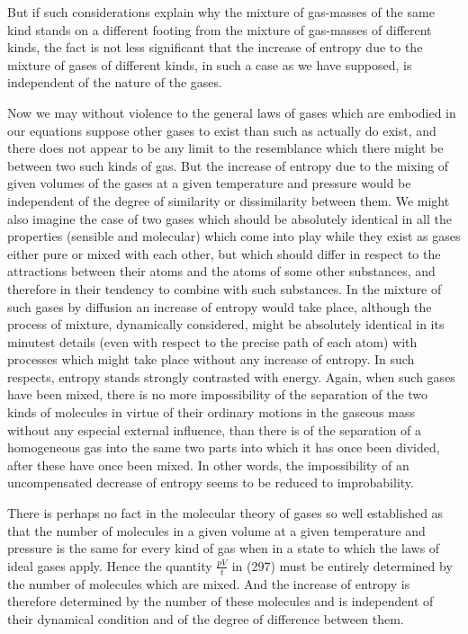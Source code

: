 \documentclass[12pt]{memoir}
\begin{document}
But if such considerations explain why the mixture of gas-masses of the same kind stands on a different footing from the mixture of gas-masses of different kinds, the fact is not less significant that the increase of entropy due to the mixture of gases of different kinds, in such a case as we have supposed, is independent of the nature of the gases.

Now we may without violence to the general laws of gases which are embodied in our equations suppose other gases to exist than such as actually do exist, and there does not appear to be any limit to the resemblance which there might be between two such kinds of gas. But the increase of entropy due to the mixing of given volumes of the gases at a given temperature and pressure would be independent of the degree of similarity or dissimilarity between them. We might also imagine the case of two gases which should be absolutely identical in all the properties (sensible and molecular) which come into play while they exist as gases either pure or mixed with each other, but which should differ in respect to the attractions between their atoms and the atoms of some other substances, and therefore in their tendency to combine with such substances. In the mixture of such gases by diffusion an increase of entropy would take place, although the process of mixture, dynamically considered, might be absolutely identical in its minutest details (even with respect to the precise path of each atom) with processes which might take place without any increase of entropy. In such respects, entropy stands strongly contrasted with energy. Again, when such gases have been mixed, there is no more impossibility of the separation of the two kinds of molecules in virtue of their ordinary motions in the gaseous mass without any especial external influence, than there is of the separation of a homogeneous gas into the same two parts into which it has once been divided, after these have once been mixed. In other words, the impossibility of an uncompensated decrease of entropy seems to be reduced to improbability. %


There is perhaps no fact in the molecular theory of gases so well established as that the number of molecules in a given volume at a given temperature and pressure is the same for every kind of gas when in a state to which the laws of ideal gases apply. Hence the quantity $\frac{pV}{t}$ in (297) must be entirely determined by the number of molecules which are mixed. And the increase of entropy is therefore determined by the number of these molecules and is independent of their dynamical condition and of the degree of difference between them.
\end{document}
